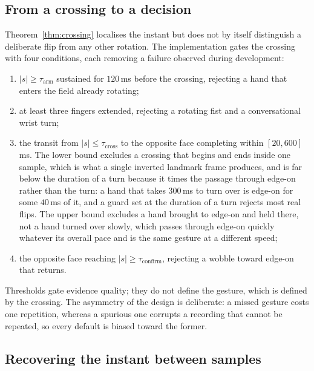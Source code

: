\documentclass{article}
\theoremstyle{definition}
\begin{document}
\subsection{From a crossing to a decision}

Theorem~\ref{thm:crossing} localises the instant but does not by itself
distinguish a deliberate flip from any other rotation. The implementation gates
the crossing with four conditions, each removing a failure observed during
development:

\begin{enumerate}[leftmargin=*, topsep=2pt, itemsep=1pt]
  \item $|s| \geq \tau_{\mathrm{arm}}$ sustained for $120$\,ms before the
        crossing, rejecting a hand that enters the field already rotating;
  \item at least three fingers extended, rejecting a rotating fist and a
        conversational wrist turn;
  \item the transit from $|s| \leq \tau_{\mathrm{cross}}$ to the opposite face
        completing within $[20, 600]$\,ms. The lower bound excludes a crossing
        that begins and ends inside one sample, which is what a single inverted
        landmark frame produces, and is far below the duration of a turn because
        it times the passage through edge-on rather than the turn: a hand that
        takes $300$\,ms to turn over is edge-on for some $40$\,ms of it, and a
        guard set at the duration of a turn rejects most real flips. The upper
        bound excludes a hand brought to edge-on and held there, not a hand
        turned over slowly, which passes through edge-on quickly whatever its
        overall pace and is the same gesture at a different speed;
  \item the opposite face reaching $|s| \geq \tau_{\mathrm{confirm}}$, rejecting
        a wobble toward edge-on that returns.
\end{enumerate}

Thresholds gate evidence quality; they do not define the gesture, which is
defined by the crossing. The asymmetry of the design is deliberate: a missed
gesture costs one repetition, whereas a spurious one corrupts a recording that
cannot be repeated, so every default is biased toward the former.

\subsection{Recovering the instant between samples}
\label{sec:interpolation}
\end{document}

